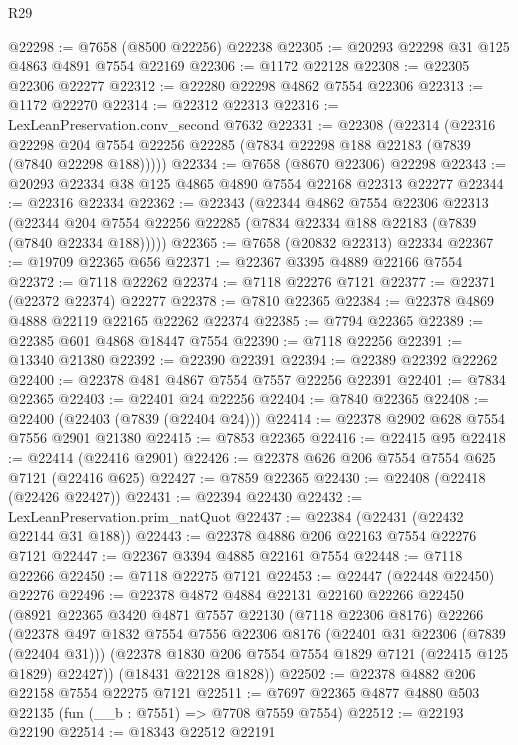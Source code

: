 \begin{lexlean}{R29}
\begin{coremodule}
@22298 := @7658 (@8500 @22256) @22238
@22305 := @20293 @22298 @31 @125 @4863 @4891 @7554 @22169
@22306 := @1172 @22128
@22308 := @22305 @22306 @22277
@22312 := @22280 @22298 @4862 @7554 @22306
@22313 := @1172 @22270
@22314 := @22312 @22313
@22316 := LexLeanPreservation.conv_second @7632
@22331 := @22308
    (@22314
      (@22316
        @22298
        @204
        @7554
        @22256
        @22285
        (@7834 @22298 @188 @22183 (@7839 (@7840 @22298 @188)))))
@22334 := @7658 (@8670 @22306) @22298
@22343 := @20293 @22334 @38 @125 @4865 @4890 @7554 @22168 @22313 @22277
@22344 := @22316 @22334
@22362 := @22343
    (@22344
      @4862
      @7554
      @22306
      @22313
      (@22344 @204 @7554 @22256 @22285 (@7834 @22334 @188 @22183 (@7839 (@7840 @22334 @188)))))
@22365 := @7658 (@20832 @22313) @22334
@22367 := @19709 @22365 @656
@22371 := @22367 @3395 @4889 @22166 @7554
@22372 := @7118 @22262
@22374 := @7118 @22276 @7121
@22377 := @22371 (@22372 @22374) @22277
@22378 := @7810 @22365
@22384 := @22378 @4869 @4888 @22119 @22165 @22262 @22374
@22385 := @7794 @22365
@22389 := @22385 @601 @4868 @18447 @7554
@22390 := @7118 @22256
@22391 := @13340 @21380
@22392 := @22390 @22391
@22394 := @22389 @22392 @22262
@22400 := @22378 @481 @4867 @7554 @7557 @22256 @22391
@22401 := @7834 @22365
@22403 := @22401 @24 @22256
@22404 := @7840 @22365
@22408 := @22400 (@22403 (@7839 (@22404 @24)))
@22414 := @22378 @2902 @628 @7554 @7556 @2901 @21380
@22415 := @7853 @22365
@22416 := @22415 @95
@22418 := @22414 (@22416 @2901)
@22426 := @22378 @626 @206 @7554 @7554 @625 @7121 (@22416 @625)
@22427 := @7859 @22365
@22430 := @22408 (@22418 (@22426 @22427))
@22431 := @22394 @22430
@22432 := LexLeanPreservation.prim_natQuot
@22437 := @22384 (@22431 (@22432 @22144 @31 @188))
@22443 := @22378 @4886 @206 @22163 @7554 @22276 @7121
@22447 := @22367 @3394 @4885 @22161 @7554
@22448 := @7118 @22266
@22450 := @7118 @22275 @7121
@22453 := @22447 (@22448 @22450) @22276
@22496 := @22378
    @4872
    @4884
    @22131
    @22160
    @22266
    @22450
    (@8921
      @22365
      @3420
      @4871
      @7557
      @22130
      (@7118 @22306 @8176)
      @22266
      (@22378
        @497
        @1832
        @7554
        @7556
        @22306
        @8176
        (@22401 @31 @22306 (@7839 (@22404 @31)))
        (@22378 @1830 @206 @7554 @7554 @1829 @7121 (@22415 @125 @1829) @22427))
      (@18431 @22128 @1828))
@22502 := @22378 @4882 @206 @22158 @7554 @22275 @7121
@22511 := @7697 @22365 @4877 @4880 @503 @22135 (fun (__b : @7551) => @7708 @7559 @7554)
@22512 := @22193 @22190
@22514 := @18343 @22512 @22191

\end{coremodule}
\end{lexlean}
